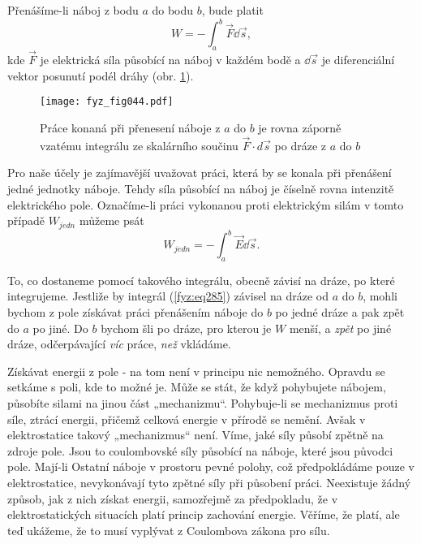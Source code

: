 {    Přenášíme-li náboj z bodu \(a\) do bodu \(b\), bude platit
    \begin{equation*}
      W = -\int_{a}^{b}\vec{F}\dd{\vec{s}},
    \end{equation*}
    kde \(\vec{F}\) je elektrická síla působící na náboj v každém bodě a \(\dd{\vec{s}}\) je 
    diferenciální vektor posunutí podél dráhy (obr. \ref{fyz:fig044}).

    \begin{figure}[ht!]  %
      \centering
      \texttt{[image: fyz\_fig044.pdf]}
      \caption{Práce konaná při přenesení náboje z \(a\) do \(b\) je rovna záporně vzatému 
        integrálu ze skalárního součinu \(\vec{F}\cdot d\vec{s}\) po dráze z \(a\) do \(b\)}
      \label{fyz:fig044}
    \end{figure}    
    Pro naše účely je zajímavější uvažovat práci, která by se konala při přenášení jedné jednotky 
    náboje. Tehdy síla působící na náboj je číselně rovna intenzitě elektrického pole. Označíme-li 
    práci vykonanou proti elektrickým silám v tomto případě \(W_{jedn}\) můžeme psát
    \begin{equation}\label{fyz:eq285}
      W_{jedn} = -\int_{a}^{b}\vec{E}\dd{\vec{s}}.
    \end{equation}
    
    To, co dostaneme pomocí takového integrálu, obecně závisí na dráze, po které integrujeme. 
    Jestliže by integrál (\ref{fyz:eq285}) závisel na dráze od \(a\) do \(b\), mohli 
    bychom z pole získávat práci přenášením náboje do \(b\) po jedné dráze a pak zpět do \(a\) po 
    jiné. Do \(b\) bychom šli po dráze, pro kterou je \(W\) menší, a \emph{zpět} po jiné dráze, 
    odčerpávající \emph{víc} práce, \emph{než} vkládáme.
    
    Získávat energii z pole - na tom není v principu nic nemožného. Opravdu se setkáme s poli, kde 
    to možné je. Může se stát, že když pohybujete nábojem, působíte silami na jinou část 
    „mechanizmu“. Pohybuje-li se mechanizmus proti síle, ztrácí energii, přičemž celková energie v 
    přírodě se nemění. Avšak v elektrostatice takový „mechanizmus“ není. Víme, jaké síly působí 
    zpětně na zdroje pole. Jsou to coulombovské síly působící na náboje, které jsou původci pole. 
    Mají-li Ostatní náboje v prostoru pevné polohy, což předpokládáme pouze v elektrostatice, 
    nevykonávají tyto zpětné síly při působení práci. Neexistuje žádný způsob, jak z nich získat 
    energii, samozřejmě za předpokladu, že v elektrostatických situacích platí princip zachování 
    energie. Věříme, že platí, ale teď ukážeme, že to musí vyplývat z Coulombova zákona pro 
    sílu.         
    
}
